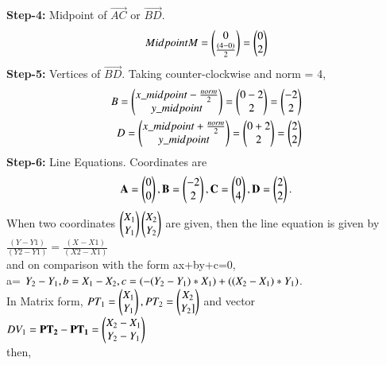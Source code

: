 \documentclass[journal,12pt,twocolumn]{IEEEtran}
\begin{document}
\textbf{Step-4:} Midpoint of $\vec{AC}$ or $\vec{BD}$.
\\
\begin{align}
\begin{split}
Midpoint M = \begin{pmatrix}0 \\ \frac{(4-0)}{2}\end{pmatrix} = \begin{pmatrix}0\\2\end{pmatrix}
\end{split}
\end{align}
\textbf{Step-5:} Vertices of $\vec{BD}$.
Taking counter-clockwise and norm = 4,
\\
\begin{align}
\begin{split}
B = \begin{pmatrix}x\_midpoint-\frac{norm}{2}\\y\_midpoint\end{pmatrix} = \begin{pmatrix}0-2\\2\end{pmatrix} = \begin{pmatrix}-2\\2\end{pmatrix}\\
D = \begin{pmatrix}x\_midpoint+\frac{norm}{2}\\y\_midpoint\end{pmatrix} = \begin{pmatrix}0+2\\2\end{pmatrix} = \begin{pmatrix}2\\2\end{pmatrix}
\end{split}
\end{align}
\textbf{Step-6:} Line Equations.
Coordinates are
\\
\begin{align}
\begin{split}
\mathbf{A} = \begin{pmatrix}0 \\ 0\end{pmatrix},
\mathbf{B} =\begin{pmatrix}-2\\2\end{pmatrix} ,
\mathbf{C} = \begin{pmatrix}0 \\ 4\end{pmatrix},
\mathbf{D} =\begin{pmatrix}2\\2\end{pmatrix}.
\end{split}
\end{align}
When two coordinates $\begin{pmatrix}X_1\\ Y_1\end{pmatrix} \begin{pmatrix}X_2 \\Y_2\end{pmatrix}$ are given, then the line equation is given by 
$\frac{(Y-Y1)}{(Y2-Y1)} = \frac{(X-X1)}{(X2-X1)}$\\
and on comparison with the form ax+by+c=0,\\ a= $Y_2-Y_1, b=X_1-X_2, \\c=(-(Y_2-Y_1)*X_1)+((X_2-X_1)*Y_1)$.\\ 
In Matrix form, $PT_1 = \begin{pmatrix}X_1\\Y_1\end{pmatrix}, PT_2 = \begin{pmatrix}X_2\\Y_2]\end{pmatrix}$ and vector \\$DV_1 = \mathbf{PT_2 - PT_1} =\begin{pmatrix}X_2-X_1\\ Y_2-Y_1\end{pmatrix}$ \\then, 
\end{document}
